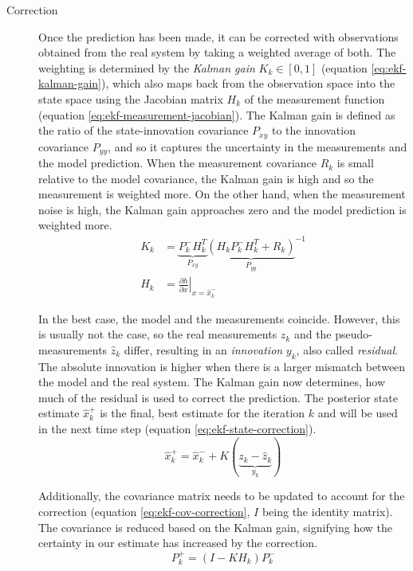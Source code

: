 \begin{description}
\item[Correction] Once the prediction has been made, it can be corrected with observations obtained from the real system by taking a weighted average of both. The weighting is determined by the \textit{Kalman gain} $K_k \in [0, 1]$ (equation \ref{eq:ekf-kalman-gain}), which also maps back from the observation space into the state space using the Jacobian matrix $H_k$ of the measurement function (equation \ref{eq:ekf-measurement-jacobian}). The Kalman gain is defined as the ratio of the state-innovation covariance $P_{xy}$ to the innovation covariance $P_{yy}$, and so it captures the uncertainty in the measurements and the model prediction. When the measurement covariance $R_k$ is small relative to the model covariance, the Kalman gain is high and so the measurement is weighted more. On the other hand, when the measurement noise is high, the Kalman gain approaches zero and the model prediction is weighted more.
\begin{align}\label{eq:ekf-kalman-gain}%
K_k &= \underbrace{P_k^- H_k^T}_\textrm{$P_{xy}$} {\underbrace{(H_k P_k^- H_k^T + R_k)}_\textrm{$P_{yy}$}}^{-1} \\%
\label{eq:ekf-measurement-jacobian}%
H_k &= \left. \frac{\partial h}{\partial x} \right|_{x = \hat{x}_{k}^-}%
\end{align}

In the best case, the model and the measurements coincide. However, this is usually not the case, so the real measurements $z_k$ and the pseudo-measurements $\hat{z}_k$ differ, resulting in an \textit{innovation} $y_k$, also called \textit{residual}. The absolute innovation is higher when there is a larger mismatch between the model and the real system. The Kalman gain now determines, how much of the residual is used to correct the prediction. The posterior state estimate $\hat{x}_k^+$ is the final, best estimate for the iteration $k$ and will be used in the next time step (equation \ref{eq:ekf-state-correction}).
\begin{equation}\label{eq:ekf-state-correction}%
\hat{x}_k^+ = \hat{x}_k^- + K(\underbrace{z_k - \hat{z}_k}_\textrm{$y_k$})%
\end{equation}

Additionally, the covariance matrix needs to be updated to account for the correction (equation \ref{eq:ekf-cov-correction}, $I$ being the identity matrix). The covariance is reduced based on the Kalman gain, signifying how the certainty in our estimate has increased by the correction.
\begin{equation}\label{eq:ekf-cov-correction}%
P_k^+ = (I - K H_k)P_k^-%
\end{equation}
\end{description}


